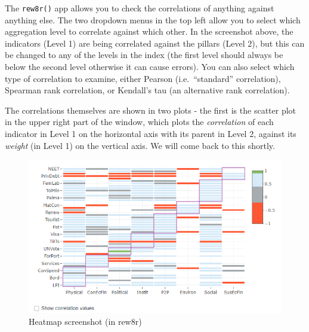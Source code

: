 \documentclass[
]{book}
\begin{document}
The \texttt{rew8r()} app allows you to check the correlations of anything against anything else. The two dropdown menus in the top left allow you to select which aggregation level to correlate against which other. In the screenshot above, the indicators (Level 1) are being correlated against the pillars (Level 2), but this can be changed to any of the levels in the index (the first level should always be below the second level otherwise it can cause errors). You can also select which type of correlation to examine, either Pearson (i.e.~``standard'' correlation), Spearman rank correlation, or Kendall's tau (an alternative rank correlation).

The correlations themselves are shown in two plots - the first is the scatter plot in the upper right part of the window, which plots the \emph{correlation} of each indicator in Level 1 on the horizontal axis with its parent in Level 2, against its \emph{weight} (in Level 1) on the vertical axis. We will come back to this shortly.

\begin{figure}

{\centering \includegraphics[width=1\linewidth]{images/corr_heatmap_screenshot_rew8r} 

}

\caption{Heatmap screenshot (in rew8r)}\label{fig:unnamed-chunk-46}
\end{figure}
\end{document}
